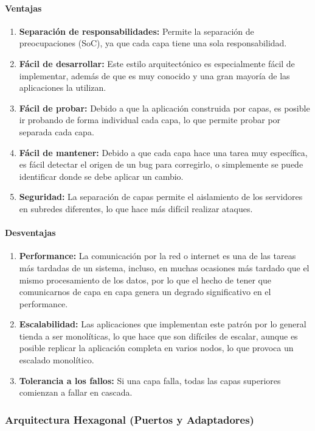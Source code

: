 \paragraph{Ventajas}
\begin{enumerate}
    \item \textbf{Separación de responsabilidades:} Permite la separación de preocupaciones (SoC), ya que cada capa tiene una sola responsabilidad.
    \item \textbf{Fácil de desarrollar:} Este estilo arquitectónico es especialmente fácil de implementar, además de que es muy conocido y una gran mayoría de las aplicaciones la utilizan.
    \item \textbf{Fácil de probar:} Debido a que la aplicación construida por capas, es posible ir probando de forma individual cada capa, lo que permite probar por separada cada capa.
    \item \textbf{Fácil de mantener:} Debido a que cada capa hace una tarea muy específica, es fácil detectar el origen de un bug para corregirlo, o simplemente se puede identificar donde se debe aplicar un cambio.
    \item \textbf{Seguridad:} La separación de capas permite el aislamiento de los servidores en subredes diferentes, lo que hace más difícil realizar ataques.
\end{enumerate}

\paragraph{Desventajas}
\begin{enumerate}
    \item \textbf{Performance:} La comunicación por la red o internet es una de las tareas más tardadas de un sistema, incluso, en muchas ocasiones más tardado que el mismo procesamiento de los datos, por lo que el hecho de tener que comunicarnos de capa en capa genera un degrado significativo en el performance.
    \item \textbf{Escalabilidad:} Las aplicaciones que implementan este patrón por lo general tienda a ser monolíticas, lo que hace que son difíciles de escalar, aunque es posible replicar la aplicación completa en varios nodos, lo que provoca un escalado monolítico.
    \item \textbf{Tolerancia a los fallos:} Si una capa falla, todas las capas superiores comienzan a fallar en cascada.
\end{enumerate}

\subsubsection{Arquitectura Hexagonal (Puertos y Adaptadores)}

